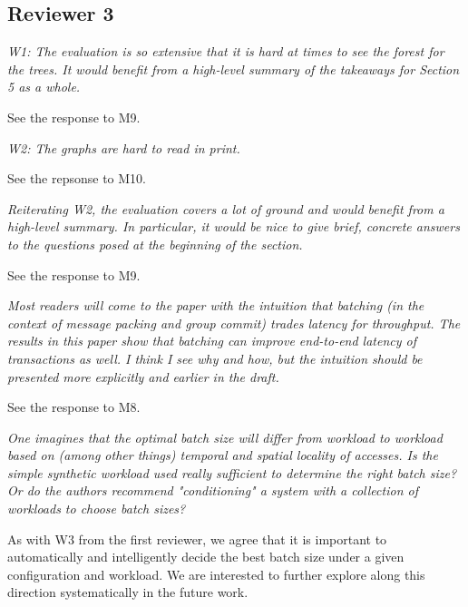 \documentclass{article}
\begin{document}
\subsection{Reviewer 3}

\emph{W1: The evaluation is so extensive that it is hard at times to see the forest for the trees. It would benefit from a high-level summary of the takeaways for Section 5 as a whole. }

\bigskip
See the response to M9.
\bigskip

\emph{W2: The graphs are hard to read in print.}

\bigskip
See the repsonse to M10.
\bigskip

\emph{Reiterating W2, the evaluation covers a lot of ground and would benefit from a high-level summary. In particular, it would be nice to give brief, concrete answers to the questions posed at the beginning of the section.}


\bigskip
See the response to M9.
\bigskip

\emph{Most readers will come to the paper with the intuition that batching (in the context of message packing and group commit) trades latency for throughput. The results in this paper show that batching can improve end-to-end latency of transactions as well. I think I see why and how, but the intuition should be presented more explicitly and earlier in the draft.}


\bigskip
See the response to M8.
\bigskip

\emph{One imagines that the optimal batch size will differ from workload to workload based on (among other things) temporal and spatial locality of accesses. Is the simple synthetic workload used really sufficient to determine the right batch size? Or do the authors recommend "conditioning" a system with a collection of workloads to choose batch sizes?}


\bigskip
As with W3 from the first reviewer, we agree that it is important to automatically and intelligently decide the best batch size under a given configuration and workload. We are interested to further explore along this direction systematically in the future work. 

\bigskip
\end{document}
